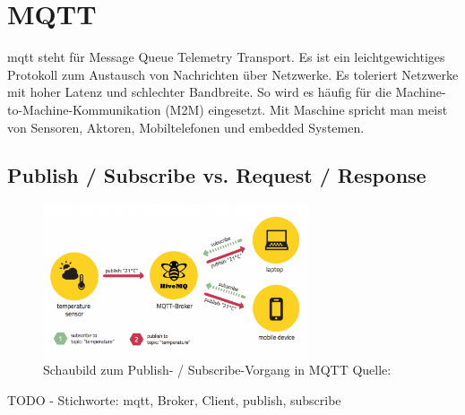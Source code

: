 \section{MQTT}
\label{sec:mqtt}
\acrshort{mqtt} steht für Message Queue Telemetry Transport. Es ist ein leichtgewichtiges Protokoll zum Austausch von Nachrichten über Netzwerke. Es toleriert Netzwerke mit hoher Latenz und schlechter Bandbreite. So wird es häufig für die Machine-to-Machine-Kommunikation (M2M) eingesetzt. Mit Maschine spricht man meist von Sensoren, Aktoren, Mobiltelefonen und embedded Systemen.

\subsection{Publish / Subscribe vs. Request / Response}
\label{sec:publish-subscribe}

\begin{figure}[H]
	\centering
	\includegraphics[width=0.7\textwidth]{img/mqtt-basics-by_hivemq.png}
	\caption{Schaubild zum Publish- / Subscribe-Vorgang in MQTT Quelle: \cite{hivemq.com-mqtt-essentials-publish-subscribe}}
	\label{fig:junit-example}
\end{figure}

TODO - Stichworte: \acrshort{mqtt}, Broker, Client, publish, subscribe
